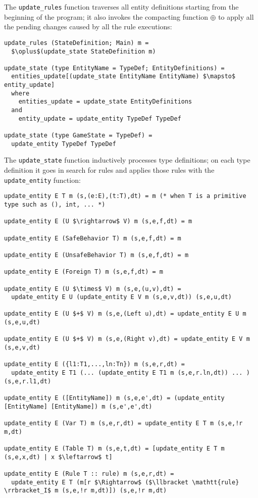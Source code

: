 The \texttt{update\_rules} function traverses all entity definitions starting from the beginning of the program; it also invokes the compacting function $\oplus$ to apply all the pending changes caused by all the rule executions:

\begin{lstlisting}
update_rules (StateDefinition; Main) m =
  $\oplus$(update_state StateDefinition m)

update_state (type EntityName = TypeDef; EntityDefinitions) =
  entities_update[(update_state EntityName EntityName) $\mapsto$ entity_update]
  where
    entities_update = update_state EntityDefinitions
  and
    entity_update = update_entity TypeDef TypeDef
    
update_state (type GameState = TypeDef) =
  update_entity TypeDef TypeDef
\end{lstlisting}

The \texttt{update\_state} function inductively processes type definitions; on each type definition it goes in search for rules and applies those rules with the \texttt{update\_entity} function:

\begin{lstlisting}
update_entity E T m (s,(e:E),(t:T),dt) = m (* when T is a primitive type such as (), int, ... *)

update_entity E (U $\rightarrow$ V) m (s,e,f,dt) = m

update_entity E (SafeBehavior T) m (s,e,f,dt) = m

update_entity E (UnsafeBehavior T) m (s,e,f,dt) = m

update_entity E (Foreign T) m (s,e,f,dt) = m

update_entity E (U $\times$ V) m (s,e,(u,v),dt) = 
  update_entity E U (update_entity E V m (s,e,v,dt)) (s,e,u,dt)

update_entity E (U $+$ V) m (s,e,(Left u),dt) = update_entity E U m (s,e,u,dt)

update_entity E (U $+$ V) m (s,e,(Right v),dt) = update_entity E V m (s,e,v,dt)

update_entity E ({l1:T1,...,ln:Tn}) m (s,e,r,dt) = 
  update_entity E T1 (... (update_entity E T1 m (s,e,r.ln,dt)) ... ) (s,e,r.l1,dt)

update_entity E ([EntityName]) m (s,e,e',dt) = (update_entity [EntityName] [EntityName]) m (s,e',e',dt)

update_entity E (Var T) m (s,e,r,dt) = update_entity E T m (s,e,!r m,dt)

update_entity E (Table T) m (s,e,t,dt) = [update_entity E T m (s,e,x,dt) | x $\leftarrow$ t]

update_entity E (Rule T :: rule) m (s,e,r,dt) = 
  update_entity E T (m[r $\Rightarrow$ ($\llbracket \mathtt{rule} \rrbracket_I$ m (s,e,!r m,dt)]) (s,e,!r m,dt)
\end{lstlisting}

